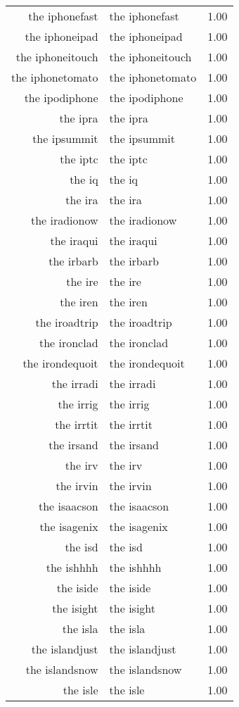 \begin{table}[ht]
\begin{tabular}{rlr}
  the iphonefast & the iphonefast & 1.00 \\ 
  the iphoneipad & the iphoneipad & 1.00 \\ 
  the iphoneitouch & the iphoneitouch & 1.00 \\ 
  the iphonetomato & the iphonetomato & 1.00 \\ 
  the ipodiphone & the ipodiphone & 1.00 \\ 
  the ipra & the ipra & 1.00 \\ 
  the ipsummit & the ipsummit & 1.00 \\ 
  the iptc & the iptc & 1.00 \\ 
  the iq & the iq & 1.00 \\ 
  the ira & the ira & 1.00 \\ 
  the iradionow & the iradionow & 1.00 \\ 
  the iraqui & the iraqui & 1.00 \\ 
  the irbarb & the irbarb & 1.00 \\ 
  the ire & the ire & 1.00 \\ 
  the iren & the iren & 1.00 \\ 
  the iroadtrip & the iroadtrip & 1.00 \\ 
  the ironclad & the ironclad & 1.00 \\ 
  the irondequoit & the irondequoit & 1.00 \\ 
  the irradi & the irradi & 1.00 \\ 
  the irrig & the irrig & 1.00 \\ 
  the irrtit & the irrtit & 1.00 \\ 
  the irsand & the irsand & 1.00 \\ 
  the irv & the irv & 1.00 \\ 
  the irvin & the irvin & 1.00 \\ 
  the isaacson & the isaacson & 1.00 \\ 
  the isagenix & the isagenix & 1.00 \\ 
  the isd & the isd & 1.00 \\ 
  the ishhhh & the ishhhh & 1.00 \\ 
  the iside & the iside & 1.00 \\ 
  the isight & the isight & 1.00 \\ 
  the isla & the isla & 1.00 \\ 
  the islandjust & the islandjust & 1.00 \\ 
  the islandsnow & the islandsnow & 1.00 \\ 
  the isle & the isle & 1.00 \\ 

\end{tabular}
\end{table}
